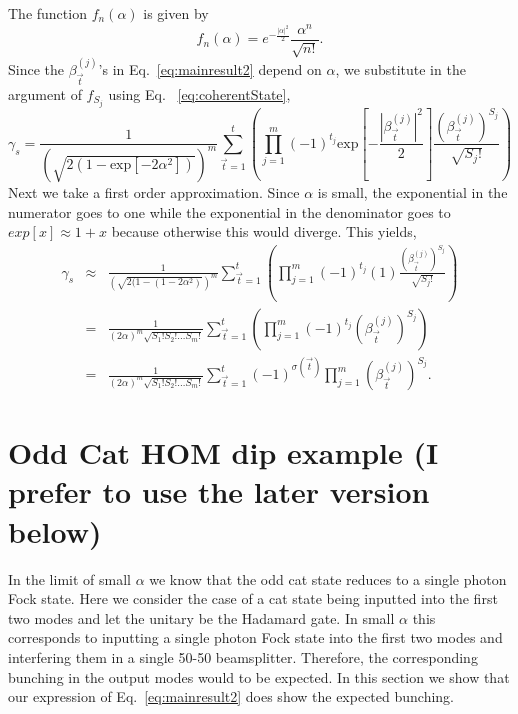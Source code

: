 \documentclass[aps,pra,singlecolumn,amsmath,amssymb,nofootinbib,superscriptaddress]{revtex4}
\begin{document}
The function $f_n(\alpha)$ is given by
\begin{equation} \label{eq:coherentState}
f_n(\alpha) = e^{-\frac{|\alpha|^2}{2}} \frac{\alpha^n}{\sqrt{n!}}.
\end{equation}
Since the $\beta_{\vec{t}}^{(j)}$'s in Eq.~\ref{eq:mainresult2} depend on $\alpha$, we substitute in the argument of $f_{S_j}$ using Eq.~ \ref{eq:coherentState},
\begin{equation} 
\gamma_s = \frac{1}{\left(\sqrt{2(1-\mathrm{exp}[-2\alpha^2])}\right)^m} \sum_{\vec{t}=1}^{t} \left(\prod_{j=1}^m (-1)^{t_j}  \mathrm{exp}\left[-\frac{|\beta_{\vec{t}}^{(j)}|^2}{2}\right] \frac{(\beta_{\vec{t}}^{(j)})^{S_j}}{\sqrt{S_j!}}\right)
\end{equation}
Next we take a first order approximation. Since $\alpha$ is small, the exponential in the numerator goes to one while the exponential in the denominator goes to $exp[x]\approx 1+x$ because otherwise this would diverge. This yields,
\begin{eqnarray} \label{eq:sub}
\gamma_s &\approx& \frac{1}{\left(\sqrt{2(1-(1-2\alpha^2)}\right)^m} \sum_{\vec{t}=1}^{t} \left(\prod_{j=1}^m (-1)^{t_j} \left(1\right) \frac{(\beta_{\vec{t}}^{(j)})^{S_j}}{\sqrt{S_j!}}\right) \nonumber \\
&=& \frac{1}{(2\alpha)^m\sqrt{S_1!S_2!\dots S_m!}} \sum_{\vec{t}=1}^{t} \left(\prod_{j=1}^m (-1)^{t_j} (\beta_{\vec{t}}^{(j)})^{S_j}\right) \nonumber \\
&=& \frac{1}{(2\alpha)^m\sqrt{S_1!S_2!\dots S_m!}} \sum_{\vec{t}=1}^{t} (-1)^{\sigma(\vec{t})}\prod_{j=1}^m (\beta_{\vec{t}}^{(j)})^{S_j}.
\end{eqnarray}

\section{Odd Cat HOM dip example (I prefer to use the later version below)}

In the limit of small $\alpha$ we know that the odd cat state reduces to a single photon Fock state. Here we consider the case of a cat state being inputted into the first two modes and let the unitary be the Hadamard gate. In small $\alpha$ this corresponds to inputting a single photon Fock state into the first two modes and interfering them in a single 50-50 beamsplitter. Therefore, the corresponding bunching in the output modes would to be expected. In this section we show that our expression of Eq.~\ref{eq:mainresult2} does show the expected bunching. 
\end{document}

